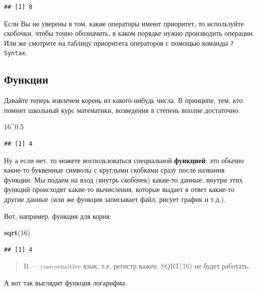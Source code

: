 \documentclass[]{book}
\newenvironment{Shaded}{\begin{snugshade}}{\end{snugshade}}
\newcommand{\KeywordTok}[1]{\textcolor[rgb]{0.13,0.29,0.53}{\textbf{#1}}}
\newcommand{\DecValTok}[1]{\textcolor[rgb]{0.00,0.00,0.81}{#1}}
\newcommand{\FloatTok}[1]{\textcolor[rgb]{0.00,0.00,0.81}{#1}}
\newcommand{\OperatorTok}[1]{\textcolor[rgb]{0.81,0.36,0.00}{\textbf{#1}}}
\newcommand{\NormalTok}[1]{#1}
\begin{document}
\begin{verbatim}
## [1] 8
\end{verbatim}

Если Вы не уверены в том, какие операторы имеют приоритет, то
используйте скобочки, чтобы точно обозначить, в каком порядке нужно
производить операции. Или же смотрите на таблицу приоритета операторов с
помощью команды \texttt{?Syntax}.

\subsection{Функции}\label{func}

Давайте теперь извлечем корень из какого-нибудь числа. В принципе, тем,
кто помнит школьный курс математики, возведения в степень вполне
достаточно:

\begin{Shaded}
\begin{Highlighting}[]
\DecValTok{16}\OperatorTok{^}\FloatTok{0.5}
\end{Highlighting}
\end{Shaded}

\begin{verbatim}
## [1] 4
\end{verbatim}

Ну а если нет, то можете воспользоваться специальной \textbf{функцией}:
это обычно какие-то буквенные символы с круглыми скобками сразу после
названия функции. Мы подаем на вход (внутрь скобочек) какие-то данные,
внутри этих функций происходят какие-то вычисления, которые выдает в
ответ какие-то другие данные (или же функция записывает файл, рисует
график и т.д.).

Вот, например, функция для корня:

\begin{Shaded}
\begin{Highlighting}[]
\KeywordTok{sqrt}\NormalTok{(}\DecValTok{16}\NormalTok{)}
\end{Highlighting}
\end{Shaded}

\begin{verbatim}
## [1] 4
\end{verbatim}

\begin{quote}
R --- case-sensitive язык, т.е. регистр важен. SQRT(16) не будет
работать.
\end{quote}

А вот так выглядит функция логарифма:
\end{document}
